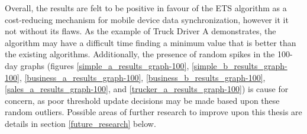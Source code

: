 Overall, the results are felt to be positive in favour of the ETS algorithm as a cost-reducing mechanism for mobile device data synchronization, however it it not without its flaws.  As the example of Truck Driver A demonstrates, the algorithm may have a difficult time finding a minimum value that is better than the existing algorithms.  Additionally, the presence of random spikes in the 100-day graphs (figures \ref{simple_a_results_graph-100}, \ref{simple_b_results_graph-100}, \ref{business_a_results_graph-100}, \ref{business_b_results_graph-100}, \ref{sales_a_results_graph-100}, and \ref{trucker_a_results_graph-100}) is cause for concern, as poor threshold update decisions may be made based upon these random outliers.  Possible areas of further research to improve upon this thesis are details in section \ref{future_research} below.

